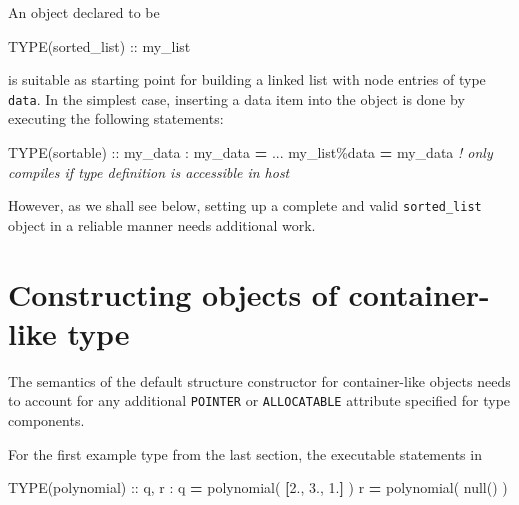 \documentclass[
]{article}
\newenvironment{Shaded}{}{}
\newcommand{\CommentTok}[1]{\textcolor[rgb]{0.38,0.63,0.69}{\textit{#1}}}
\newcommand{\DataTypeTok}[1]{\textcolor[rgb]{0.56,0.13,0.00}{#1}}
\newcommand{\FloatTok}[1]{\textcolor[rgb]{0.25,0.63,0.44}{#1}}
\newcommand{\KeywordTok}[1]{\textcolor[rgb]{0.00,0.44,0.13}{\textbf{#1}}}
\newcommand{\NormalTok}[1]{#1}
\newcommand{\OperatorTok}[1]{\textcolor[rgb]{0.40,0.40,0.40}{#1}}
\begin{document}
An object declared to be

\begin{Shaded}
\begin{Highlighting}[]
\DataTypeTok{TYPE(sorted\_list)} \DataTypeTok{::}\NormalTok{ my\_list}
\end{Highlighting}
\end{Shaded}

is suitable as starting point for building a linked list with node
entries of type \texttt{data}. In the simplest case, inserting a data
item into the object is done by executing the following statements:

\begin{Shaded}
\begin{Highlighting}[]
\DataTypeTok{TYPE(sortable)} \DataTypeTok{::}\NormalTok{ my\_data}
\NormalTok{:}
\NormalTok{my\_data }\KeywordTok{=}\NormalTok{ ...}
\NormalTok{my\_list}\OperatorTok{\%}\NormalTok{data }\KeywordTok{=}\NormalTok{ my\_data  }\CommentTok{! only compiles if type definition is accessible in host}
\end{Highlighting}
\end{Shaded}

However, as we shall see below, setting up a complete and valid
\texttt{sorted\_list} object in a reliable manner needs additional work.

\section{Constructing objects of container-like
type}\label{constructing-objects-of-container-like-type}

The semantics of the default structure constructor for container-like
objects needs to account for any additional \texttt{POINTER} or
\texttt{ALLOCATABLE} attribute specified for type components.

For the first example type from the last section, the executable
statements in

\begin{Shaded}
\begin{Highlighting}[]
\DataTypeTok{TYPE(polynomial)} \DataTypeTok{::}\NormalTok{ q, r}
\NormalTok{:}
\NormalTok{q }\KeywordTok{=}\NormalTok{ polynomial( }\KeywordTok{[}\FloatTok{2.}\NormalTok{, }\FloatTok{3.}\NormalTok{, }\FloatTok{1.}\KeywordTok{]}\NormalTok{ )}
\NormalTok{r }\KeywordTok{=}\NormalTok{ polynomial( null() )}
\end{Highlighting}
\end{Shaded}
\end{document}
